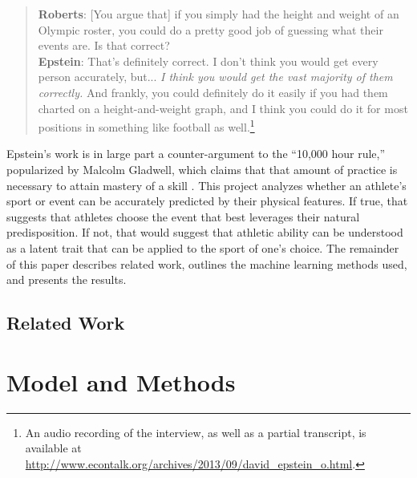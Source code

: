 \documentclass[12pt,letterpaper]{article} %
\begin{document}
\begin{quote}
\footnotesize
\textbf{Roberts}: [You argue that] if you simply had the height and weight of an Olympic roster, you could do a pretty good job of guessing what their events are. Is that correct? \\
\textbf{Epstein}: That's definitely correct. I don't think you would get every person accurately, but... \textit{I think you would get the vast majority of them correctly.} And frankly, you could definitely do it easily if you had them charted on a height-and-weight graph, and I think you could do it for most positions in something like football as well.\footnote{An audio recording of the interview, as well as a partial transcript, is available at \url{http://www.econtalk.org/archives/2013/09/david_epstein_o.html}.}
\end{quote}

Epstein's work is in large part a counter-argument to the ``10,000 hour rule,'' popularized by Malcolm Gladwell, which claims that that amount of practice is necessary to attain mastery of a skill \citep{gladwell2008outliers}. This project analyzes whether an athlete's sport or event can be accurately predicted by their physical features. If true, that suggests that athletes choose the event that best leverages their natural predisposition. If not, that would suggest that athletic ability can be understood as a latent trait that can be applied to the sport of one's choice. The remainder of this paper describes related work, outlines the machine learning methods used, and presents the results.


\subsection{Related Work}





\section{Model and Methods}
\end{document}
